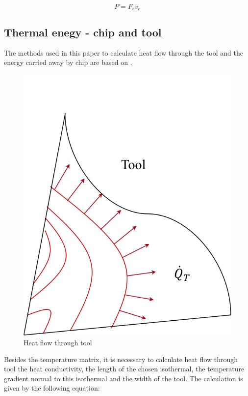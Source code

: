 	\begin{equation} 
	\label{eq_power}
		P = F_{c}v_{c}
	\end{equation}
	
	\subsection{Thermal enegy - chip and tool}
	The methods used in this paper to calculate heat flow through the tool and the energy carried away by chip are based on \cite{boothroyd1963temperatures}.

	\begin{figure}[H]
		\centering
		\captionsetup{justification=centering}
		\includegraphics[scale=0.6]{Cap4/ToolHeat.png}
		\caption{Heat flow through tool}
		\label{fig:heattool}
	\end{figure}

	Besides the temperature matrix, it is necessary to calculate heat flow through tool the heat conductivity, the length of the chosen isothermal, the temperature gradient normal to this isothermal and the width of the tool. The calculation is given by the following equation:

